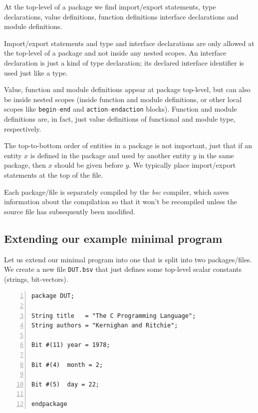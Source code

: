 At the top-level of a package we find import/export statements, type
declarations, value definitions, function definitions interface
declarations and module definitions.

Import/export statements and type and interface declarations are only
allowed at the top-level of a package and not inside any nested
scopes.  An interface declaration is just a kind of type declaration;
its declared interface identifier is used just like a type.

Value, function and module definitions appear at package top-level,
but can also be inside nested scopes (inside function and module
definitions, or other local scopes like \verb|begin|--\verb|end| and
\verb|action|--\verb|endaction| blocks).  Function and module
definitions are, in fact, just value definitions of functional and
module type, respectively.

The top-to-bottom order of entities in a package is not important,
just that if an entity $x$ is defined in the package and used by
another entity $y$ in the same package, then $x$ should be given
before $y$.  We typically place import/export statements at the top of
the file.

Each package/file is separately compiled by the \emph{bsc} compiler,
which saves information about the compilation so that it won't be
recompiled unless the source file has subsequently been modified.

\hdivider


\subsection{Extending our example minimal {\BSV} program}

\label{Sec_Top_and_DUT}

Let us extend our minimal {\BSV} program into one that is split into two
packages/files.  We create a new file \verb|DUT.bsv| that just defines
some top-level scalar constants (strings, bit-vectors).

{\footnotesize
\begin{Verbatim}[frame=single, numbers=left, label=in file Ex-03-B-Top-and-DUT/DUT.bsv]
package DUT;

String title   = "The C Programming Language";
String authors = "Kernighan and Ritchie";

Bit #(11) year = 1978;

Bit #(4)  month = 2;

Bit #(5)  day = 22;

endpackage
\end{Verbatim}
}

